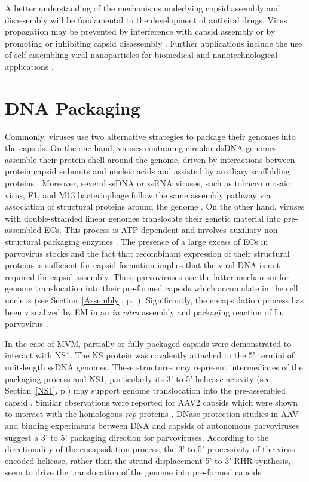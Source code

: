 A better understanding of the mechanisms underlying capsid assembly and disassembly will be fundamental to the development of antiviral drugs. Virus propagation may be prevented by interference with capsid assembly or by promoting or inhibiting capsid disassembly \cite{pmid21762804, pmid21163649}. Further applications include the use of self-assembling viral nanoparticles for biomedical and nanotechnological applications \cite{pmid16521330, pmid16690856}.     


  
\section{DNA Packaging}
\label{Packaging}

Commonly, viruses use two alternative strategies to package their genomes into the capsids. On the one hand, viruses containing circular dsDNA genomes assemble their protein shell around the genome, driven by interactions between protein capsid subunits and nucleic acids and assisted by auxiliary scaffolding proteins \cite{pmid6101085, pmid6305987, pmid1323699}. Moreover, several ssDNA or ssRNA viruses, such as tobacco mosaic virus, F1, and M13 bacteriophage follow the same assembly pathway via association of structural proteins around the genome \cite{pmid11406604}. On the other hand, viruses with double-stranded linear genomes translocate their genetic material into pre-assembled ECs. This process is ATP-dependent and involves auxiliary non-structural packaging enzymes \cite{pmid2679356}. The presence of a large excess of ECs in parvovirus stocks and the fact that recombinant expression of their structural proteins is sufficient for capsid formation \cite{pmid1331503} implies that the viral DNA is not required for capsid assembly. Thus, parvoviruses use the latter mechanism for genome translocation into their pre-formed capsids which accumulate in the cell nucleus (see Section~\ref{Assembly}, p.~\pageref{Assembly}). Significantly, the encapsidation process has been visualized by EM in an \textit{in vitro} assembly and packaging reaction of Lu parvovirus \cite{pmid6221078}.

In the case of MVM, partially or fully packaged capsids were demonstrated to interact with NS1. The NS protein was covalently attached to the 5' termini of unit-length ssDNA genomes. These structures may represent intermediates of the packaging process and NS1, particularly its 3' to 5' helicase activity (see Section~\ref{NS1}, p.\pageref{NS1}) may support genome translocation into the pre-assembled capsid \cite{pmid2527311}. Similar observations were reported for AAV2 capsids which were shown to interact with the homologous \textit{rep} proteins \cite{pmid8553536, pmid8995658}. DNase protection studies in AAV \cite{pmid11406604} and binding experiments between DNA and capsids of autonomous parvoviruses \cite{pmid2145445, pmid8350419} suggest a 3’ to 5’ packaging direction for parvoviruses. According to the directionality of the encapsidation process, the 3’ to 5’ processivity of the virus-encoded helicase, rather than the strand displacement 5' to 3' RHR synthesis, seem to drive the translocation of the genome into pre-formed capsids \cite{pmid11406604}. 

